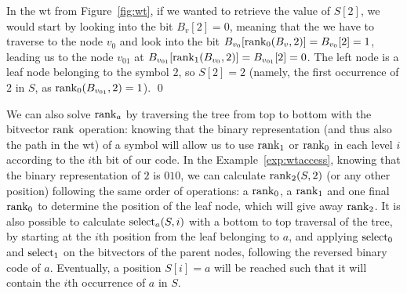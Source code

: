 \documentclass[a4paper,10pt,twoside]{book}
\begin{document}
    \begin{example} \label{exp:wtaccess}
    In the \gls{wt} from Figure~\ref{fig:wt}, if we wanted to retrieve the value of $S[2]$, we would start by looking into the bit $B_v[2]=0$, meaning that the we have to traverse to the node $v_0$ and look into the bit $B_{v_0}[\operatorname{rank}_0(B_v,2)] = B_{v_0}[2] = 1$, leading us to the node $v_{01}$ at $B_{v_{01}}[\operatorname{rank}_1(B_{v_0},2)] = B_{v_{01}}[2] = 0$. The left node is a leaf node belonging to the symbol $2$, so $S[2]=2$ (namely, the first occurrence of $2$ in $S$, as $\operatorname{rank}_0(B_{v_{01}}, 2) = 1$).
    \qed
    \end{example}
    
    We can also solve $\operatorname{rank}_a$ by traversing the tree from top to bottom with the bitvector $\operatorname{rank}$ operation: knowing that the binary representation (and thus also the path in the \gls{wt}) of a symbol will allow us to use $\operatorname{rank}_1$ or $\operatorname{rank}_0$ in each level $i$ according to the $i$th bit of our code. In the Example~\ref{exp:wtaccess}, knowing that the binary representation of $2$ is $010$, we can calculate $\operatorname{rank}_2(S,2)$ (or any other position) following the same order of operations: a $\operatorname{rank}_0$, a $\operatorname{rank}_1$ and one final $\operatorname{rank}_0$ to determine the position of the leaf node, which will give away $\operatorname{rank}_2$. It is also possible to calculate $\operatorname{select}_a(S,i)$ with a bottom to top traversal of the tree, by starting at the $i$th position from the leaf belonging to $a$, and applying $\operatorname{select}_0$ and $\operatorname{select}_1$ on the bitvectors of the parent nodes, following the reversed binary code of $a$. Eventually, a position $S[i]=a$ will be reached such that it will contain the $i$th occurrence of $a$ in $S$.
    
\end{document}
